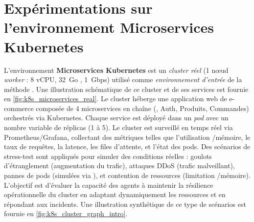 \section{Expérimentations sur l'environnement Microservices Kubernetes}


L'environnement \textbf{Microservices Kubernetes} est un \emph{cluster réel} (1 nœud \textit{worker} : 8 vCPU, 32~Go , 1~Gbps) utilisé comme \emph{environnement d'entrée} de la méthode . Une illustration schématique de ce cluster et de ses services est fournie en \autoref{fig:k8s_microservices_real}. Le cluster héberge une application web de e-commerce composée de 4 microservices en chaîne (, Auth, Produits, Commandes) orchestrés via Kubernetes. Chaque service est déployé dans un \emph{pod} avec un nombre variable de réplicas (1 à 5). Le cluster est surveillé en temps réel via Prometheus/Grafana, collectant des métriques telles que l'utilisation /mémoire, le taux de requêtes, la latence, les files d'attente, et l'état des pods. Des scénarios de stress-test sont appliqués pour simuler des conditions réelles : goulots d'étranglement (augmentation du trafic), attaques DDoS (trafic malveillant), pannes de pods (simulées via ), et contention de ressources (limitation /mémoire). L'objectif est d'évaluer la capacité des agents à maintenir la résilience opérationnelle du cluster en adaptant dynamiquement les ressources et en répondant aux incidents. Une illustration synthétique de ce type de scénarios est fournie en \autoref{fig:k8s_cluster_graph_intro}.

